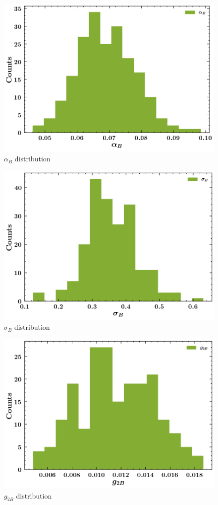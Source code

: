 \documentclass[
]{article}
\begin{document}
\begin{figure}
\centering
\includegraphics{pngplots/param6.png}
\caption{\(\alpha_B\) distribution}
\end{figure}

\begin{figure}
\centering
\includegraphics{pngplots/param7.png}
\caption{\(\sigma_B\) distribution}
\end{figure}

\begin{figure}
\centering
\includegraphics{pngplots/param8.png}
\caption{\(g_{2B}\) distribution}
\end{figure}
\end{document}
